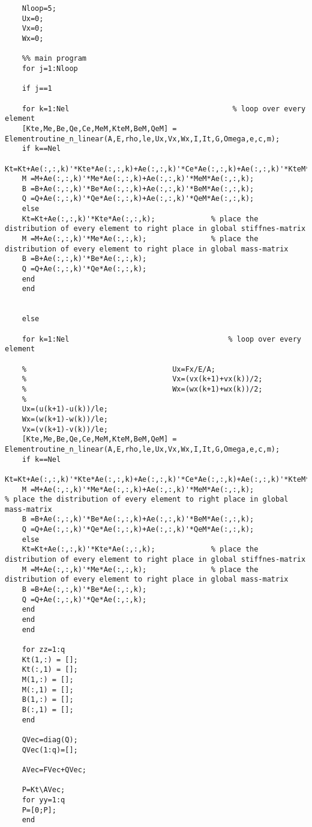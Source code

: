 \begin{lstlisting}
	Nloop=5;
	Ux=0;
	Vx=0;
	Wx=0;
	
	%% main program
	for j=1:Nloop
	
	if j==1
	
	for k=1:Nel                                      % loop over every element
	[Kte,Me,Be,Qe,Ce,MeM,KteM,BeM,QeM] = Elementroutine_n_linear(A,E,rho,le,Ux,Vx,Wx,I,It,G,Omega,e,c,m);
	if k==Nel
	Kt=Kt+Ae(:,:,k)'*Kte*Ae(:,:,k)+Ae(:,:,k)'*Ce*Ae(:,:,k)+Ae(:,:,k)'*KteM*Ae(:,:,k);
	M =M+Ae(:,:,k)'*Me*Ae(:,:,k)+Ae(:,:,k)'*MeM*Ae(:,:,k);              
	B =B+Ae(:,:,k)'*Be*Ae(:,:,k)+Ae(:,:,k)'*BeM*Ae(:,:,k);
	Q =Q+Ae(:,:,k)'*Qe*Ae(:,:,k)+Ae(:,:,k)'*QeM*Ae(:,:,k);
	else
	Kt=Kt+Ae(:,:,k)'*Kte*Ae(:,:,k);             % place the distribution of every element to right place in global stiffnes-matrix
	M =M+Ae(:,:,k)'*Me*Ae(:,:,k);               % place the distribution of every element to right place in global mass-matrix
	B =B+Ae(:,:,k)'*Be*Ae(:,:,k);
	Q =Q+Ae(:,:,k)'*Qe*Ae(:,:,k);
	end
	end
	
	
	else
	
	for k=1:Nel                                     % loop over every element
	
	%                                  Ux=Fx/E/A;
	%                                  Vx=(vx(k+1)+vx(k))/2;
	%                                  Wx=(wx(k+1)+wx(k))/2;
	%            
	Ux=(u(k+1)-u(k))/le;
	Wx=(w(k+1)-w(k))/le;
	Vx=(v(k+1)-v(k))/le;
	[Kte,Me,Be,Qe,Ce,MeM,KteM,BeM,QeM] = Elementroutine_n_linear(A,E,rho,le,Ux,Vx,Wx,I,It,G,Omega,e,c,m);
	if k==Nel
	Kt=Kt+Ae(:,:,k)'*Kte*Ae(:,:,k)+Ae(:,:,k)'*Ce*Ae(:,:,k)+Ae(:,:,k)'*KteM*Ae(:,:,k);
	M =M+Ae(:,:,k)'*Me*Ae(:,:,k)+Ae(:,:,k)'*MeM*Ae(:,:,k);               % place the distribution of every element to right place in global mass-matrix
	B =B+Ae(:,:,k)'*Be*Ae(:,:,k)+Ae(:,:,k)'*BeM*Ae(:,:,k);
	Q =Q+Ae(:,:,k)'*Qe*Ae(:,:,k)+Ae(:,:,k)'*QeM*Ae(:,:,k);
	else
	Kt=Kt+Ae(:,:,k)'*Kte*Ae(:,:,k);             % place the distribution of every element to right place in global stiffnes-matrix
	M =M+Ae(:,:,k)'*Me*Ae(:,:,k);               % place the distribution of every element to right place in global mass-matrix
	B =B+Ae(:,:,k)'*Be*Ae(:,:,k);
	Q =Q+Ae(:,:,k)'*Qe*Ae(:,:,k);
	end
	end
	end
	
	for zz=1:q
	Kt(1,:) = [];
	Kt(:,1) = [];
	M(1,:) = [];
	M(:,1) = [];
	B(1,:) = [];
	B(:,1) = [];
	end
	
	QVec=diag(Q);
	QVec(1:q)=[];
	
	AVec=FVec+QVec;
	
	P=Kt\AVec;
	for yy=1:q
	P=[0;P];
	end
	

\end{lstlisting}
